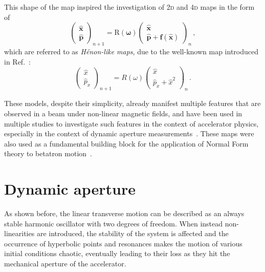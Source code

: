 This shape of the map inspired the investigation of 2\textsc{d} and 4\textsc{d} maps in the form of
\begin{equation}
	\begin{pmatrix}
		\hat{\mathbf{x}} \\ \hat{\mathbf{p}}  
	\end{pmatrix}_{n+1}
	=
	\mathrm{R}(\bm\omega)
		\begin{pmatrix}
			\hat{\mathbf{x}} \\ \hat{\mathbf{p}} + \mathbf{f}(\hat{\mathbf{x}})
	\end{pmatrix}_{n} \,,
	\label{eq:henonlike}
\end{equation}
which are referred to as \textit{Hénon-like maps}, due to the well-known map introduced in Ref.~\cite{henon}:
%
\begin{equation}
	\begin{pmatrix}
		\hat x \\ \hat p_x
	\end{pmatrix}_{n+1}
	=
	R(\omega)
		\begin{pmatrix}
			\hat x \\ \hat p_x + \hat x^2
	\end{pmatrix}_{n} \,.
	\label{eq:simplehenon}
\end{equation}

These models, despite their simplicity, already manifest multiple features that are observed in a beam under non-linear magnetic fields, and have been used in multiple studies to investigate such features in the context of accelerator physics, especially in the context of dynamic aperture measurements~\cite{PhysRevE.53.4067, invlog}. These maps were also used as a fundamental building block for the application of Normal Form theory to betatron motion~\cite{Bazzani:262179}.

\section{Dynamic aperture}
\label{sec:2:dynamic_aperture}

As shown before, the linear transverse motion can be described as an always stable harmonic oscillator with two degrees of freedom. When instead non-linearities are introduced, the stability of the system is affected and the occurrence of hyperbolic points and resonances makes the motion of various initial conditions chaotic, eventually leading to their loss as they hit the mechanical aperture of the accelerator.

